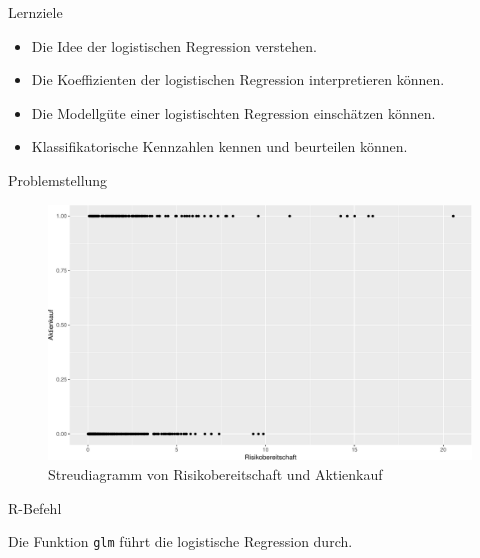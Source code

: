 \begin{frame}{Lernziele}

\begin{itemize}
\tightlist
\item
  Die Idee der logistischen Regression verstehen.
\item
  Die Koeffizienten der logistischen Regression interpretieren können.
\item
  Die Modellgüte einer logistischten Regression einschätzen können.
\item
  Klassifikatorische Kennzahlen kennen und beurteilen können.
\end{itemize}

\end{frame}

\begin{frame}{Problemstellung}

\begin{figure}

{\centering \includegraphics[width=0.5\linewidth]{PraDa_Folien_nm_2_files/figure-beamer/fig-logist-regr1-1} 

}

\caption{Streudiagramm von Risikobereitschaft und Aktienkauf}\label{fig:fig-logist-regr1}
\end{figure}

\end{frame}

\begin{frame}[fragile]{R-Befehl}

Die Funktion \texttt{glm} führt die logistische Regression durch.

\begin{Shaded}
\begin{Highlighting}[]
\StringTok{ }\OperatorTok{~}\StringTok{ } \NormalTok{(}\NormalTok{), }
\end{Highlighting}
\end{Shaded}

\end{frame}


